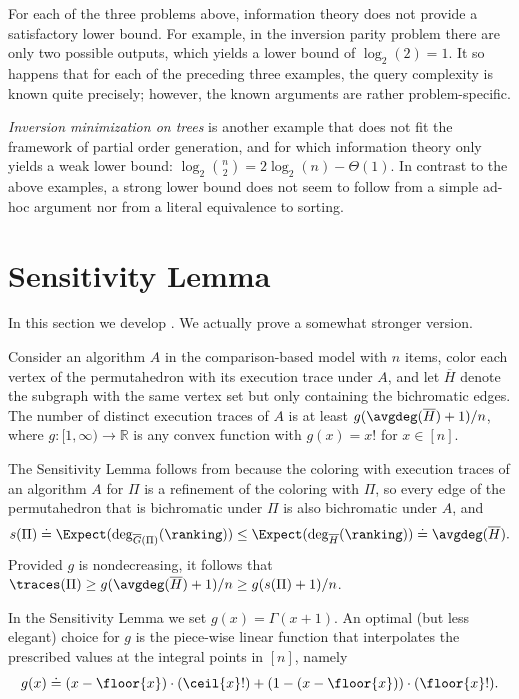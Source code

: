For each of the three problems above, information theory does not provide a satisfactory lower bound. For example, in the inversion parity problem there are only two possible outputs, which yields a lower bound of $\log_2(2)=1$. It so happens that for each of the preceding three examples, the query complexity is known quite precisely; however, the known arguments are rather problem-specific.

\emph{Inversion minimization on trees} is another example that does not fit the framework of partial order generation, and for which information theory only yields a weak lower bound: $\log_2 \binom{n}{2} = 2 \log_2(n) - \Theta(1)$. In contrast to the above examples, a strong lower bound does not seem to follow from a simple ad-hoc argument nor from a literal equivalence to sorting. 



\section{Sensitivity Lemma}
\label{sec:sensitivity}

In this section we develop .
We actually prove a somewhat stronger version.

\begin{lemma}\label{lemma:sensitivity:strong}
Consider an algorithm $A$ in the comparison-based
model with $n$ items, color each vertex of the permutahedron with its execution trace under $A$, and let $\overline{H}$ denote the subgraph with the same vertex set but only containing the bichromatic edges. The number of distinct execution traces of $A$ is at least $g(\avgdeg(\overline{H})+1)/n$, where
$g: [1,\infty) \to \mathbb{R}$ is any convex function with $g(x) = x!$ for $x \in [n]$.
\end{lemma}
The Sensitivity Lemma follows from  because the coloring with execution traces of an algorithm $A$ for $\Pi$ is a refinement of the coloring with $\Pi$, so every edge of the permutahedron that is bichromatic under $\Pi$ is also bichromatic under $A$, and
\[
s(\Pi) \doteq \Expect(\deg_{\overline{G}(\Pi)}(\ranking)) \le \Expect(\deg_{\overline{H}}(\ranking)) \doteq \avgdeg(\overline{H}). 
\]
Provided $g$ is nondecreasing, it follows that $\traces(\Pi) \ge g(\avgdeg(\overline{H})+1)/n \ge g(s(\Pi)+1)/n$.

In the Sensitivity Lemma we set $g(x) = \Gamma(x+1)$. An optimal (but less elegant) choice for $g$ is the piece-wise linear function that interpolates the prescribed values at the integral points in $[n]$, namely
\[    g(x) \doteq
      (x - \floor{x})\cdot(\ceil{x}!)
      +
      (1 - (x - \floor{x}))\cdot(\floor{x}!).
\]      

